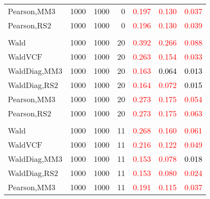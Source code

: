 \documentclass[
]{article}
\begin{document}
\begin{table}[H]
{\begin{tabular}[t]{lrrrrrr}
\hspace{1em}Pearson,MM3 & 1000 & 1000 & 0 & \textcolor{red}{0.197} & \textcolor{red}{0.130} & \textcolor{red}{0.037}\\
\hspace{1em}Pearson,RS2 & 1000 & 1000 & 0 & \textcolor{red}{0.196} & \textcolor{red}{0.130} & \textcolor{red}{0.039}\\
\addlinespace[0.3em]
\multicolumn{7}{l}{\textbf{1F 15V}}\\
\hspace{1em}Wald & 1000 & 1000 & 20 & \textcolor{red}{0.392} & \textcolor{red}{0.266} & \textcolor{red}{0.088}\\
\hspace{1em}WaldVCF & 1000 & 1000 & 20 & \textcolor{red}{0.263} & \textcolor{red}{0.154} & \textcolor{red}{0.033}\\
\hspace{1em}WaldDiag,MM3 & 1000 & 1000 & 20 & \textcolor{red}{0.163} & \textcolor{black}{0.064} & \textcolor{black}{0.013}\\
\hspace{1em}WaldDiag,RS2 & 1000 & 1000 & 20 & \textcolor{red}{0.164} & \textcolor{red}{0.072} & \textcolor{black}{0.015}\\
\hspace{1em}Pearson,MM3 & 1000 & 1000 & 20 & \textcolor{red}{0.273} & \textcolor{red}{0.175} & \textcolor{red}{0.054}\\
\hspace{1em}Pearson,RS2 & 1000 & 1000 & 20 & \textcolor{red}{0.273} & \textcolor{red}{0.175} & \textcolor{red}{0.063}\\
\addlinespace[0.3em]
\multicolumn{7}{l}{\textbf{2F 10V}}\\
\hspace{1em}Wald & 1000 & 1000 & 11 & \textcolor{red}{0.268} & \textcolor{red}{0.160} & \textcolor{red}{0.061}\\
\hspace{1em}WaldVCF & 1000 & 1000 & 11 & \textcolor{red}{0.216} & \textcolor{red}{0.122} & \textcolor{red}{0.049}\\
\hspace{1em}WaldDiag,MM3 & 1000 & 1000 & 11 & \textcolor{red}{0.153} & \textcolor{red}{0.078} & \textcolor{black}{0.018}\\
\hspace{1em}WaldDiag,RS2 & 1000 & 1000 & 11 & \textcolor{red}{0.153} & \textcolor{red}{0.080} & \textcolor{red}{0.024}\\
\hspace{1em}Pearson,MM3 & 1000 & 1000 & 11 & \textcolor{red}{0.191} & \textcolor{red}{0.115} & \textcolor{red}{0.037}\\

\end{tabular}}
\end{table}
\end{document}
